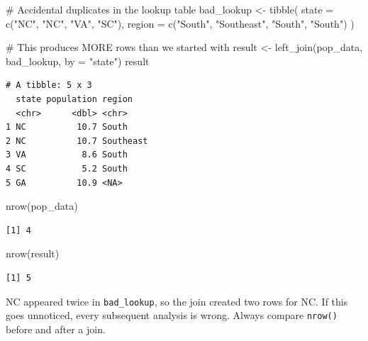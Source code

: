 \documentclass[
  letterpaper,
  DIV=11,
  numbers=noendperiod]{scrreprt}
\newenvironment{Shaded}{\begin{snugshade}}{\end{snugshade}}
\newcommand{\AttributeTok}[1]{\textcolor[rgb]{0.40,0.45,0.13}{#1}}
\newcommand{\CommentTok}[1]{\textcolor[rgb]{0.37,0.37,0.37}{#1}}
\newcommand{\FunctionTok}[1]{\textcolor[rgb]{0.28,0.35,0.67}{#1}}
\newcommand{\NormalTok}[1]{\textcolor[rgb]{0.00,0.23,0.31}{#1}}
\newcommand{\OtherTok}[1]{\textcolor[rgb]{0.00,0.23,0.31}{#1}}
\newcommand{\StringTok}[1]{\textcolor[rgb]{0.13,0.47,0.30}{#1}}
\begin{document}
\begin{Shaded}
\begin{Highlighting}[]
\CommentTok{\# Accidental duplicates in the lookup table}
\NormalTok{bad\_lookup }\OtherTok{\textless{}{-}} \FunctionTok{tibble}\NormalTok{(}
    \AttributeTok{state =} \FunctionTok{c}\NormalTok{(}\StringTok{"NC"}\NormalTok{, }\StringTok{"NC"}\NormalTok{, }\StringTok{"VA"}\NormalTok{, }\StringTok{"SC"}\NormalTok{),}
    \AttributeTok{region =} \FunctionTok{c}\NormalTok{(}\StringTok{"South"}\NormalTok{, }\StringTok{"Southeast"}\NormalTok{, }\StringTok{"South"}\NormalTok{, }\StringTok{"South"}\NormalTok{)}
\NormalTok{)}

\CommentTok{\# This produces MORE rows than we started with}
\NormalTok{result }\OtherTok{\textless{}{-}} \FunctionTok{left\_join}\NormalTok{(pop\_data, bad\_lookup, }\AttributeTok{by =} \StringTok{"state"}\NormalTok{)}
\NormalTok{result}
\end{Highlighting}
\end{Shaded}

\begin{verbatim}
# A tibble: 5 x 3
  state population region   
  <chr>      <dbl> <chr>    
1 NC          10.7 South    
2 NC          10.7 Southeast
3 VA           8.6 South    
4 SC           5.2 South    
5 GA          10.9 <NA>     
\end{verbatim}

\begin{Shaded}
\begin{Highlighting}[]
\FunctionTok{nrow}\NormalTok{(pop\_data)}
\end{Highlighting}
\end{Shaded}

\begin{verbatim}
[1] 4
\end{verbatim}

\begin{Shaded}
\begin{Highlighting}[]
\FunctionTok{nrow}\NormalTok{(result)}
\end{Highlighting}
\end{Shaded}

\begin{verbatim}
[1] 5
\end{verbatim}

NC appeared twice in \texttt{bad\_lookup}, so the join created two rows
for NC. If this goes unnoticed, every subsequent analysis is wrong.
Always compare \texttt{nrow()} before and after a join.
\end{document}
